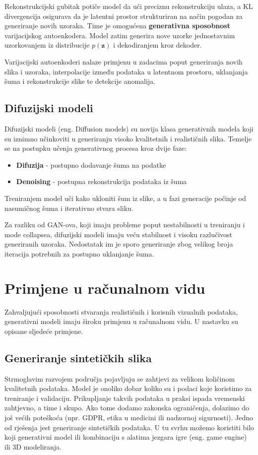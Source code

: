 \documentclass[times, utf8, seminar, numeric]{fer}
\begin{document}
		Rekonstrukcijski gubitak potiče model da uči preciznu rekonstrukciju ulaza, a KL divergencija osigurava da je latentni prostor strukturiran na način pogodan za generiranje novih uzoraka. Time je omogućena \textbf{generativna sposobnost} varijacijskog autoenkodera. Model zatim generira nove uzorke jednostavnim uzorkovanjem iz distribucije $p(\mathbf{z})$ i dekodiranjem kroz dekoder.
		
		Varijacijski autoenkoderi nalaze primjenu u zadacima poput generiranja novih slika i uzoraka, interpolacije između podataka u latentnom prostoru, uklanjanja šuma i rekonstrukcije slike te detekcije anomalija.
		
		\section{Difuzijski modeli}
		Difuzijski modeli (eng. Diffusion models) su novija klasa generativnih modela koji su iznimno učinkoviti u generiranju visoko kvalitetnih i realističnih slika. 
		Temelje se na postupku učenja generativnog procesa kroz dvije faze:
		\begin{itemize}
			\item \textbf{Difuzija} - postupno dodavanje šuma na podatke
			\item \textbf{Denoising} - postupna rekonstrukcija podataka iz šuma
		\end{itemize}
		Treniranjem model uči kako ukloniti šum iz slike, a u fazi generacije počinje od nasumičnog šuma i iterativno stvara sliku.
		
		Za razliku od GAN-ova, koji imaju probleme poput nestabilnosti u treniranju i mode collapsea, difuzijski modeli imaju veću stabilnost i visoku razlučivost generiranih uzoraka. Nedostatak im je sporo generiranje zbog velikog broja iteracija potrebnih za postupno uklanjanje šuma.
	
	
	\chapter{Primjene u računalnom vidu}		
		Zahvaljujući sposobnosti stvaranja realističnih i korisnih vizualnih podataka, generativni modeli imaju široku primjenu u računalnom vidu. U nastavku su opisane sljedeće primjene.
		
		\section{Generiranje sintetičkih slika}
		Strmoglavim razvojem područja pojavljuju se zahtjevi za velikom količinom kvalitetnih podataka. Model je onoliko dobar koliko su i podaci koje koristimo za treniranje i validaciju. Prikupljanje takvih podataka u praksi ispada vremenski zahtjevno, a time i skupo. Ako tome dodamo zakonska ograničenja, dolazimo do još većih poteškoća (npr. GDPR, etika u medicini ili nadzornoj sigurnosti). Jedno od rješenja jest generiranje sintetičkih podataka. U tu svrhu možemo koristiti bilo koji generativni model ili kombinaciju s alatima jezgara igre (eng. game engine) ili 3D modeliranja. \cite{jimaging8110310}
		
\end{document}

